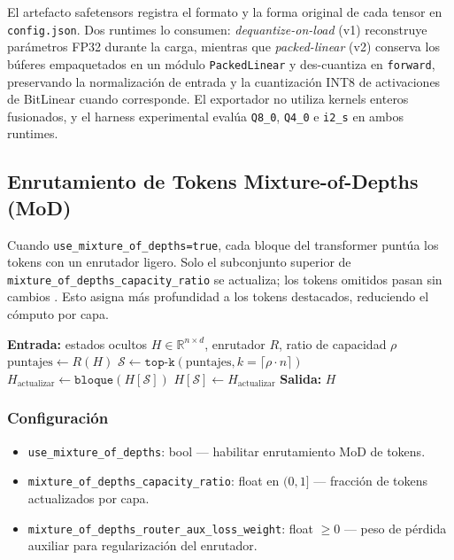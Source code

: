 El artefacto safetensors registra el formato y la forma original de cada tensor en \texttt{config.json}. Dos runtimes lo consumen: \emph{dequantize-on-load} (v1) reconstruye parámetros FP32 durante la carga, mientras que \emph{packed-linear} (v2) conserva los búferes empaquetados en un módulo \texttt{PackedLinear} y des-cuantiza en \texttt{forward}, preservando la normalización de entrada y la cuantización INT8 de activaciones de BitLinear cuando corresponde. El exportador no utiliza kernels enteros fusionados, y el harness experimental evalúa \texttt{Q8\_0}, \texttt{Q4\_0} e \texttt{i2\_s} en ambos runtimes.

\subsection{Enrutamiento de Tokens Mixture-of-Depths (MoD)}


Cuando \texttt{use\_mixture\_of\_depths=true}, cada bloque del transformer puntúa los tokens con un enrutador ligero. Solo el subconjunto superior de \texttt{mixture\_of\_depths\_capacity\_ratio} se actualiza; los tokens omitidos pasan sin cambios \citep{zhu2026mixtureofdepthsattention}. Esto asigna más profundidad a los tokens destacados, reduciendo el cómputo por capa.

\begin{algorithmic}[1]
\State \textbf{Entrada:} estados ocultos $H \in \mathbb{R}^{n \times d}$, enrutador $R$, ratio de capacidad $\rho$
\State $\text{puntajes} \gets R(H)$ 
\State $\mathcal{S} \gets \texttt{top-k}(\text{puntajes}, k=\lceil \rho \cdot n \rceil)$ 
\State $H_{\text{actualizar}} \gets \texttt{bloque}(H[\mathcal{S}])$ 
\State $H[\mathcal{S}] \gets H_{\text{actualizar}}$ 
\State \textbf{Salida:} $H$ 
\end{algorithmic}

\subsubsection{Configuración}
\begin{itemize}[leftmargin=*]
    \item \texttt{use\_mixture\_of\_depths}: bool --- habilitar enrutamiento MoD de tokens.
    \item \texttt{mixture\_of\_depths\_capacity\_ratio}: float en $(0, 1]$ --- fracción de tokens actualizados por capa.
    \item \texttt{mixture\_of\_depths\_router\_aux\_loss\_weight}: float $\ge 0$ --- peso de pérdida auxiliar para regularización del enrutador.
\end{itemize}

